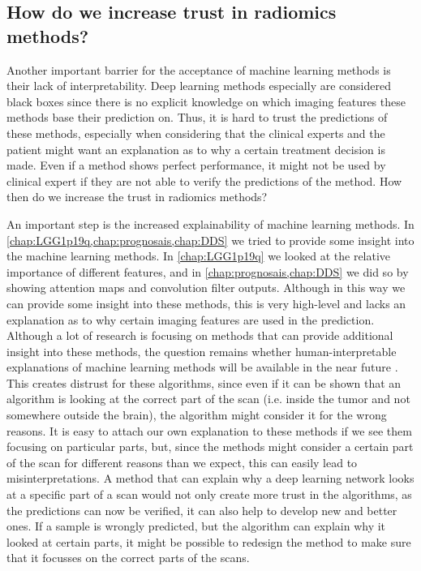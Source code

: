 \subsection{How do we increase trust in radiomics methods?}

Another important barrier for the acceptance of machine learning methods is their lack of interpretability.
Deep learning methods especially are considered black boxes since there is no explicit knowledge on which imaging features these methods base their prediction on.
Thus, it is hard to trust the predictions of these methods, especially when considering that the clinical experts and the patient might want an explanation as to why a certain treatment decision is made.
Even if a method shows perfect performance, it might not be used by clinical expert if they are not able to verify the predictions of the method.
How then do we increase the trust in radiomics methods?

An important step is the increased explainability of machine learning methods.
In \cref{chap:LGG1p19q,chap:prognosais,chap:DDS} we  tried to provide some insight into the machine learning methods.
In \cref{chap:LGG1p19q} we looked at the relative importance of different features, and in \cref{chap:prognosais,chap:DDS} we did so by showing attention maps and convolution filter outputs.
Although in this way we can provide some insight into these methods, this is very high-level and lacks an explanation as to why certain imaging features are used in the prediction.
Although a lot of research is focusing on methods that can provide additional insight into these methods, the question remains whether human-interpretable explanations of machine learning methods will be available in the near future \autocite{zhang2018interpretable}.
This creates distrust for these algorithms, since even if it can be shown that an algorithm is looking at the correct part of the scan (i.e. inside the tumor and not somewhere outside the brain), the algorithm might consider it for the wrong reasons.
It is easy to attach our own explanation to these methods if we see them focusing on particular parts, but, since the methods might consider a certain part of the scan for different reasons than we expect, this can easily lead to misinterpretations.
A method that can explain why a deep learning network looks at a specific part of a scan would not only create more trust in the algorithms, as the predictions can now be verified, it can also help to develop new and better ones.
If a sample is wrongly predicted, but the algorithm can explain why it looked at certain parts, it might be possible to redesign the method to make sure that it focusses on the correct parts of the scans.

